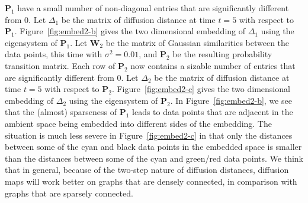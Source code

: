 $\mathbf{P}_1$ have a small number of non-diagonal entries that are
significantly different from $0$. Let $\Delta_{1}$ be the matrix of
diffusion distance at time $t = 5$ with respect to
$\mathbf{P}_1$. Figure~\ref{fig:embed2-b} gives the two dimensional
embedding of $\Delta_{1}$ using the eigensystem of $\mathbf{P}_1$. Let
$\mathbf{W}_2$ be the matrix of Gaussian similarities between the data
points, this time with $\sigma^{2} = 0.01$, and $\mathbf{P}_2$ be the
resulting probability transition matrix. Each row of $\mathbf{P}_2$
now contains a sizable number of entries that are significantly
different from $0$. Let $\Delta_{2}$ be the matrix of diffusion
distance at time $t = 5$ with respect to
$\mathbf{P}_2$. Figure~\ref{fig:embed2-c} gives the two dimensional
embedding of $\Delta_{2}$ using the eigensystem of $\mathbf{P}_2$. In
Figure~\ref{fig:embed2-b}, we see that the (almost) sparseness of
$\mathbf{P}_1$ leads to data points that are adjacent in the ambient
space being embedded into different sides of the embedding. The
situation is much less severe in Figure~\ref{fig:embed2-c} in that
only the distances between some of the cyan and black data points in
the embedded space is smaller than the distances between some of the
cyan and green/red data points. We think that in general, because of
the two-step nature of diffusion distances, diffusion maps will work
better on graphs that are densely connected, in comparison with graphs
that are sparsely connected. 
